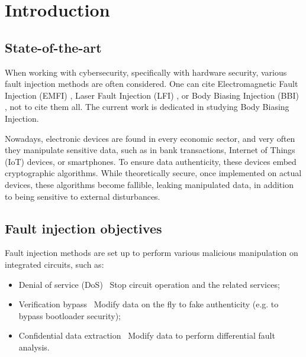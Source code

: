 
\section{Introduction}

\subsection{State-of-the-art}
	When working with cybersecurity, specifically with hardware security, various fault injection methods are often considered.
	One can cite Electromagnetic Fault Injection (EMFI) \cite{bibid}, Laser Fault Injection (LFI) \cite{bibid}, or Body Biasing Injection (BBI) \cite{bibid}, not to cite them all.
	The current work is dedicated in studying Body Biasing Injection.

	Nowadays, electronic devices are found in every economic sector, and very often they manipulate sensitive data, such as in bank transactions, Internet of Things (IoT) devices, or smartphones.
	To ensure data authenticity, these devices embed cryptographic algorithms.
	While theoretically secure, once implemented on actual devices, these algorithms become fallible, leaking manipulated data, in addition to being sensitive to external disturbances.

\subsection{Fault injection objectives}
	Fault injection methods are set up to perform various malicious manipulation on integrated circuits, such as:
	\begin{itemize}
		\item Denial of service (DoS) \textrightarrow\ Stop circuit operation and the related services;
		\item Verification bypass \textrightarrow\ Modify data on the fly to fake authenticity (e.g. to bypass bootloader security);
		\item Confidential data extraction \textrightarrow\ Modify data to perform differential fault analysis.
	\end{itemize}

